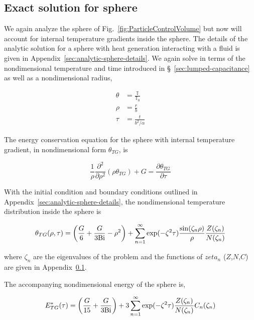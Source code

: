 \subsection{Exact solution for sphere}\label{sec:analytic-sphere}

We again analyze the sphere of Fig.~\ref{fig:ParticleControlVolume} but now will account for internal temperature gradients inside the sphere. The details of the analytic solution for a sphere with heat generation interacting with a fluid is given in Appendix~\ref{sec:analytic-sphere-details}. We again solve in terms of the nondimensional temperature and time introduced in \S~\ref{sec:lumped-capacitance} as well as a nondimensional radius,

\begin{align*}
    \theta &= \frac{\mathbb{T}}{\mathbb{T}_0}\\
    \rho & = \frac{r}{b}\\
    \tau & = \frac{t}{b^2/\alpha}
\end{align*}

The energy conservation equation for the sphere with internal temperature gradient, in nondimensional form $\theta_{TG}$, is

\begin{equation}
    \frac{1}{\rho}\frac{\partial^2}{\partial \rho^2}(\rho\theta_{TG}) + G = \frac{\partial\theta_{TG}}{\partial \tau}
\end{equation}

With the initial condition and boundary conditions outlined in Appendix~\ref{sec:analytic-sphere-details}, the nondimensional temperature distribution inside the sphere is 

\begin{equation}\label{eq:analytic-temperature-distribution}
    \theta_{TG}(\rho,\tau) = \left(\frac{G}{6} + \frac{G}{3\mathrm{Bi}}-\rho^2\right)  +   \sum_{n=1}^\infty \exp(-\zeta^2 \tau) \frac{\sin(\zeta_n \rho)}{\rho} \frac{Z(\zeta_n)}{N(\zeta_n)}  
\end{equation}

where $\zeta_n$ are the eigenvalues of the problem and the functions of $zeta_n$ ($Z$,$N$,$C$) are given in Appendix~\ref{sec:analytic-sphere}. 

The accompanying nondimensional energy of the sphere is,

\begin{equation}
\label{eq:analytic-energy-profile}
    E^*_{TG}(\tau)=\left(\frac{G}{15}+\frac{G}{3\mathrm{Bi}}\right)+3\sum_{n=1}^\infty \exp(-\zeta^2 \tau) \frac{Z(\zeta_n)}{N(\zeta_n)} C_n(\zeta_n)
\end{equation}

